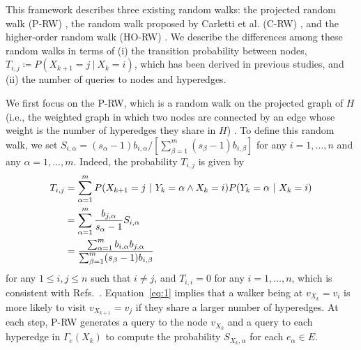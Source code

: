 This framework describes three existing random walks: the projected random walk (P-RW) \cite{zhou2006, battiston2020, zhang2023, traversa2024}, the random walk proposed by Carletti et al. (C-RW) \cite{carletti2020}, and the higher-order random walk (HO-RW) \cite{banerjee2021, luo2024, traversa2024}.
We describe the differences among these random walks in terms of (i) the transition probability between nodes, $T_{i,j} \coloneq P(X_{k+1}=j\ |\ X_k = i)$, which has been derived in previous studies, and (ii) the number of queries to nodes and hyperedges.


We first focus on the P-RW, which is a random walk on the projected graph of $H$ (i.e., the weighted graph in which two nodes are connected by an edge whose weight is the number of hyperedges they share in $H$) \cite{zhou2006, battiston2020, zhang2023, traversa2024}.
To define this random walk, we set $S_{i, \alpha} = (s_{\alpha} - 1) b_{i,\alpha} / \left[\sum_{\beta=1}^m (s_{\beta} - 1) b_{i,\beta}\right]$ for any $i=1, \ldots, n$ and any $\alpha = 1, \ldots, m$.
Indeed, the probability $T_{i,j}$ is given by
\begin{align}
T_{i,j} &= \sum_{\alpha=1}^m P(X_{k+1} = j \ |\ Y_k=\alpha \land X_k=i) P(Y_k=\alpha\ |\ X_k = i) \notag \\
&= \sum_{\alpha=1}^m \frac{b_{j,\alpha}}{s_{\alpha} - 1} S_{i, \alpha} \notag \\
&= \frac{\sum_{\alpha=1}^m b_{i, \alpha} b_{j, \alpha}} {\sum_{\beta=1}^m (s_{\beta} - 1) b_{i, \beta}}
\label{eq:1}
\end{align}
for any $1 \leq i, j \leq n$ such that $i \neq j$, and $T_{i,i} = 0$ for any $i = 1, \ldots, n$, which is consistent with Refs.~\cite{zhou2006, battiston2020, zhang2023, traversa2024}.
Equation~\eqref{eq:1} implies that a walker being at $v_{X_k} = v_i$ is more likely to visit $v_{X_{k+1}} = v_j$ if they share a larger number of hyperedges.
At each step, P-RW generates a query to the node $v_{X_k}$ and a query to each hyperedge in $\Gamma_e(X_{k})$ to compute the probability $S_{X_k, \alpha}$ for each $e_{\alpha} \in E$.


